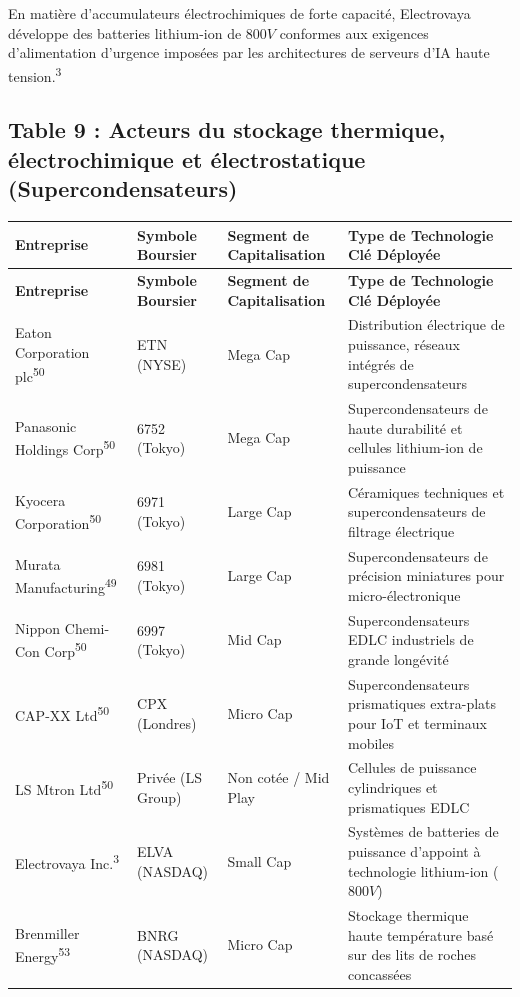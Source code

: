 \documentclass[11pt,a4paper]{article}
\begin{document}
En matière d'accumulateurs électrochimiques de forte capacité, Electrovaya développe des batteries lithium-ion de $800 V$ conformes aux exigences d'alimentation d'urgence imposées par les architectures de serveurs d'IA haute tension.\textsuperscript{3}

\subsection*{Table 9 : Acteurs du stockage thermique, électrochimique et électrostatique (Supercondensateurs)}
\begin{longtable}{p{3cm} p{3.5cm} p{3cm} p{5cm}}
\toprule
\textbf{Entreprise} & \textbf{Symbole Boursier} & \textbf{Segment de Capitalisation} & \textbf{Type de Technologie Clé Déployée} \\
\midrule
\endfirsthead
\toprule
\textbf{Entreprise} & \textbf{Symbole Boursier} & \textbf{Segment de Capitalisation} & \textbf{Type de Technologie Clé Déployée} \\
\midrule
\endhead
Eaton Corporation plc\textsuperscript{50} & ETN (NYSE) & Mega Cap & Distribution électrique de puissance, réseaux intégrés de supercondensateurs \\
Panasonic Holdings Corp\textsuperscript{50} & 6752 (Tokyo) & Mega Cap & Supercondensateurs de haute durabilité et cellules lithium-ion de puissance \\
Kyocera Corporation\textsuperscript{50} & 6971 (Tokyo) & Large Cap & Céramiques techniques et supercondensateurs de filtrage électrique \\
Murata Manufacturing\textsuperscript{49} & 6981 (Tokyo) & Large Cap & Supercondensateurs de précision miniatures pour micro-électronique \\
Nippon Chemi-Con Corp\textsuperscript{50} & 6997 (Tokyo) & Mid Cap & Supercondensateurs EDLC industriels de grande longévité \\
CAP-XX Ltd\textsuperscript{50} & CPX (Londres) & Micro Cap & Supercondensateurs prismatiques extra-plats pour IoT et terminaux mobiles \\
LS Mtron Ltd\textsuperscript{50} & Privée (LS Group) & Non cotée / Mid Play & Cellules de puissance cylindriques et prismatiques EDLC \\
Electrovaya Inc.\textsuperscript{3} & ELVA (NASDAQ) & Small Cap & Systèmes de batteries de puissance d'appoint à technologie lithium-ion ($800 V$) \\
Brenmiller Energy\textsuperscript{53} & BNRG (NASDAQ) & Micro Cap & Stockage thermique haute température basé sur des lits de roches concassées \\

\end{longtable}
\end{document}
